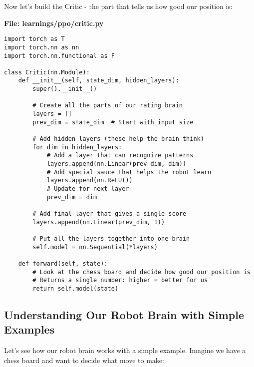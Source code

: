 \documentclass[11pt]{article}
\begin{document}
Now let's build the Critic - the part that tells us how good our position is:

\begin{tcolorbox}[colback=red!5!white,colframe=red!75!black,title=Building the Critic Network]
\textbf{File: learnings/ppo/critic.py}
\begin{lstlisting}[style=Python]
import torch as T
import torch.nn as nn
import torch.nn.functional as F

class Critic(nn.Module):
    def __init__(self, state_dim, hidden_layers):
        super().__init__()
        
        # Create all the parts of our rating brain
        layers = []
        prev_dim = state_dim  # Start with input size
        
        # Add hidden layers (these help the brain think)
        for dim in hidden_layers:
            # Add a layer that can recognize patterns
            layers.append(nn.Linear(prev_dim, dim))
            # Add special sauce that helps the robot learn
            layers.append(nn.ReLU())
            # Update for next layer
            prev_dim = dim
        
        # Add final layer that gives a single score
        layers.append(nn.Linear(prev_dim, 1))
        
        # Put all the layers together into one brain
        self.model = nn.Sequential(*layers)
    
    def forward(self, state):
        # Look at the chess board and decide how good our position is
        # Returns a single number: higher = better for us
        return self.model(state)
\end{lstlisting}
\end{tcolorbox}

\subsection{Understanding Our Robot Brain with Simple Examples}

Let's see how our robot brain works with a simple example. Imagine we have a chess board and want to decide what move to make:
\end{document}
